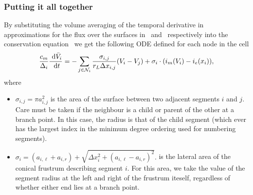 \subsubsection{Putting it all together}
By substituting the volume averaging of the temporal derivative in~ approximations for the flux over the surfaces in~ and~ respectively into the conservation equation~ we get the following ODE defined for each node in the cell
\begin{equation}
    \frac{c_m}{\Delta_i} \frac{~\text{d}{\bar{V}_i}}{~\text{d}{t}}
       = -\sum_{j\in\mathcal{N}_i} {\frac{\sigma_{i,j}}{r_L \Delta x_{i,j}} (V_i-V_j)} + \sigma_i\cdot(i_m(V_i) - i_e(x_i)),
    \label{eq:ode}
\end{equation}
where
\begin{itemize}
    \item   $\sigma_{i,j}=\pi a_{i,j}^2$ is the area of the surface between two adjacent segments $i$ and $j$. Care must be taken if the neighbour is a child or parent of the other at a branch point. In this case, the radius is that of the child segment (which ever has the largest index in the minimum degree ordering used for numbering segments). 
    \item   $\sigma_{i}=(a_{i,\ell} + a_{i,r})+\sqrt{\Delta x_i^2 + (a_{i,\ell} - a_{i,r})^2}.$ is the lateral area of the conical frustrum describing segment $i$. For this area, we take the value of the segment radius at the left and right of the frustrum iteself, regardless of whether either end lies at a branch point.
\end{itemize}

